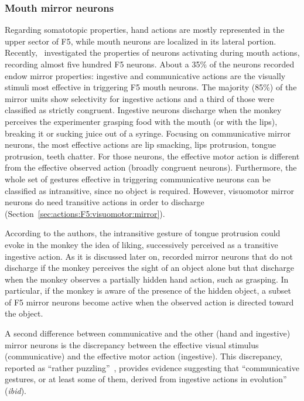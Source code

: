 \subsubsection{Mouth mirror neurons}
\label{sec:actions:F5:visuomotor:mouth}
Regarding somatotopic properties, hand actions are mostly represented in the
upper sector of F5, while mouth neurons are localized in its 
lateral portion.
Recently,~\citet{ferrari.etal:2003} investigated the properties of neurons
activating during mouth actions, recording almost five hundred F5 neurons.
About a 35\% of the neurons recorded endow mirror properties:
ingestive and communicative actions are the visually stimuli most
effective in triggering F5 mouth neurons.
The majority (85\%) of the mirror units show selectivity for
ingestive actions and a third of those were classified as strictly congruent.
Ingestive neurons discharge when the monkey perceives the experimenter grasping
food with the mouth (or with the lips), breaking it or sucking juice out of a
syringe.
Focusing on communicative mirror neurons, the most effective actions are
lip smacking, lips protrusion, tongue protrusion, teeth chatter.
For those neurons, the effective motor action is different from the effective
observed action (broadly congruent neurons).
Furthermore, the whole set of gestures effective in triggering communicative
neurons can be classified as intransitive, since no object is required. 
However, visuomotor mirror neurons do need transitive actions
in order to discharge (Section~\ref{sec:actions:F5:visuomotor:mirror}).

According to the authors, the intransitive gesture of tongue protrusion could 
evoke in the monkey the idea of liking, successively perceived as a transitive
ingestive action. 
As it is discussed later on, \citet{umilta.etal:2001} recorded mirror neurons
that do not discharge if the monkey perceives the sight of an object alone but
that discharge when the monkey observes a partially hidden hand action, such as
grasping.
In particular, if the monkey is aware of the presence of the hidden object, 
a subset of F5 mirror neurons become active when the observed
action is directed toward the object.

A second difference between communicative and the other (hand and ingestive)
mirror neurons is the discrepancy between the effective visual stimulus
(communicative) and the effective motor action (ingestive).
This discrepancy, reported as ``rather
puzzling''~\citep{rizzolatti.craighero:2004}, provides evidence suggesting that
``communicative gestures, or at least some of them, derived from ingestive
actions in evolution'' (\emph{ibid}).


